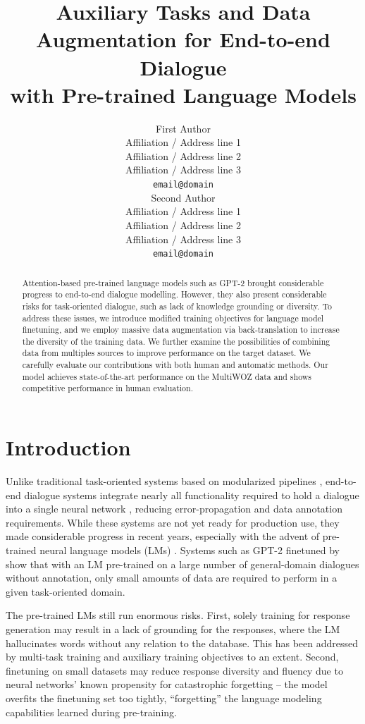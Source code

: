 \documentclass[11pt,a4paper]{article}
\title{Auxiliary Tasks and Data Augmentation for End-to-end Dialogue \\with Pre-trained Language Models}
\author{First Author \\
  Affiliation / Address line 1 \\
  Affiliation / Address line 2 \\
  Affiliation / Address line 3 \\
  \texttt{email@domain} \\\And
  Second Author \\
  Affiliation / Address line 1 \\
  Affiliation / Address line 2 \\
  Affiliation / Address line 3 \\
  \texttt{email@domain} \\}
\begin{document}
\maketitle
\begin{abstract}
Attention-based pre-trained language models such as GPT-2 brought considerable progress to end-to-end dialogue modelling. However, they also present considerable risks for task-oriented dialogue, such as lack of knowledge grounding or diversity. To address these issues, we introduce modified training objectives for language model finetuning, and we employ massive data augmentation via back-translation to increase the diversity of the training data. We further examine the possibilities of combining data from multiples sources to improve performance on the target dataset. We carefully evaluate our contributions with both human and automatic methods. Our model achieves state-of-the-art performance on the MultiWOZ data and shows competitive performance in human evaluation.
\end{abstract}

\section{Introduction}
Unlike traditional task-oriented systems based on modularized pipelines \cite{young2013, gao2018}, end-to-end dialogue systems integrate nearly all functionality required to hold a dialogue into a single neural network \cite{wen2017,manning2017,lei2018}, reducing error-propagation and data annotation requirements. While these systems are not yet ready for production use, they made considerable progress in recent years, especially with the advent of pre-trained neural language models (LMs) \cite{devlin2019,radford2019,zhang2020dialogpt}.
Systems such as GPT-2 finetuned by \citet{budzianowski2019} show that with an LM pre-trained on a large number of general-domain dialogues without annotation, only small amounts of data are required to perform in a given task-oriented domain.

The pre-trained LMs still run enormous risks. First, solely training for response generation may result in a lack of grounding for the responses, where the LM hallucinates words without any relation to the database. This has been addressed by multi-task training and auxiliary training objectives \cite{peng2020} to an extent. Second, finetuning on small datasets may reduce response diversity and fluency due to neural networks' known propensity for catastrophic forgetting \cite{greco_psycholinguistics_2019} -- the model overfits the finetuning set too tightly, “forgetting” the language modeling capabilities learned during pre-training.
\end{document}
